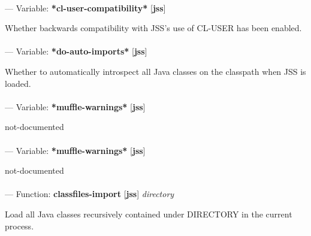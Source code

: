 \paragraph{}
\label{JSS:*CL-USER-COMPATIBILITY*}
--- Variable: \textbf{*cl-user-compatibility*} [\textbf{jss}] \textit{}

\begin{adjustwidth}{5em}{5em}
Whether backwards compatibility with JSS's use of CL-USER has been enabled.
\end{adjustwidth}

\paragraph{}
\label{JSS:*DO-AUTO-IMPORTS*}
--- Variable: \textbf{*do-auto-imports*} [\textbf{jss}] \textit{}

\begin{adjustwidth}{5em}{5em}
Whether to automatically introspect all Java classes on the classpath when JSS is loaded.
\end{adjustwidth}

\paragraph{}
\label{JSS:*MUFFLE-WARNINGS*}
--- Variable: \textbf{*muffle-warnings*} [\textbf{jss}] \textit{}

\begin{adjustwidth}{5em}{5em}
not-documented
\end{adjustwidth}

\paragraph{}
\label{JSS:*MUFFLE-WARNINGS*}
--- Variable: \textbf{*muffle-warnings*} [\textbf{jss}] \textit{}

\begin{adjustwidth}{5em}{5em}
not-documented
\end{adjustwidth}

\paragraph{}
\label{JSS:CLASSFILES-IMPORT}
--- Function: \textbf{classfiles-import} [\textbf{jss}] \textit{directory}

\begin{adjustwidth}{5em}{5em}
Load all Java classes recursively contained under DIRECTORY in the current process.
\end{adjustwidth}

